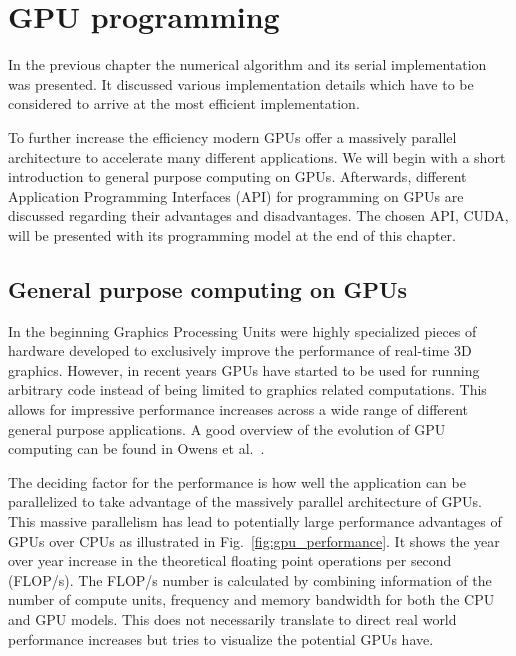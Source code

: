 \chapter{GPU programming}
\label{cha:gpu_programming}

In the previous chapter the numerical algorithm and its serial implementation was presented. It discussed various implementation details which have to be considered to arrive at the most efficient implementation.

To further increase the efficiency modern GPUs offer a massively parallel architecture to accelerate many different applications. We will begin with a short introduction to general purpose computing on GPUs. Afterwards, different Application Programming Interfaces (API) for programming on GPUs are discussed regarding their advantages and disadvantages. The chosen API, CUDA, will be presented with its programming model at the end of this chapter.

\section{General purpose computing on GPUs}
In the beginning Graphics Processing Units were highly specialized pieces of hardware developed to exclusively improve the performance of real-time 3D graphics. However, in recent years GPUs have started to be used for running arbitrary code instead of being limited to graphics related computations. This allows for impressive performance increases across a wide range of different general purpose applications. A good overview of the evolution of GPU computing can be found in Owens et al.~\cite{Owens2008}.

The deciding factor for the performance is how well the application can be parallelized to take advantage of the massively parallel architecture of GPUs. This massive parallelism has lead to potentially large performance advantages of GPUs over CPUs as illustrated in Fig.~\ref{fig:gpu_performance}. It shows the year over year increase in the theoretical floating point operations per second (FLOP/s). The FLOP/s number is calculated by combining information of the number of compute units, frequency and memory bandwidth for both the CPU and GPU models. This does not necessarily translate to direct real world performance increases but tries to visualize the potential GPUs have.

